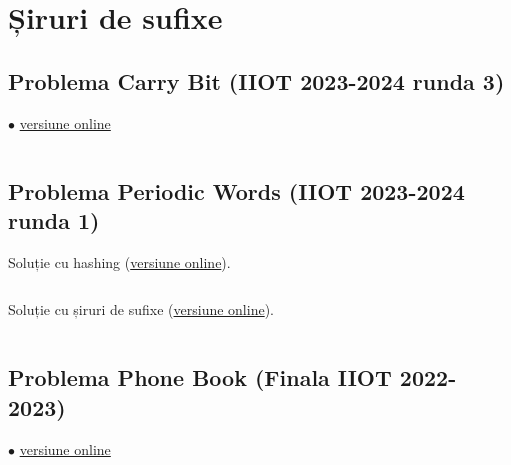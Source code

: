 \documentclass[../main.tex]{subfiles}
\begin{document}
\chapter{Șiruri de sufixe}

\section{Problema Carry Bit (IIOT 2023-2024 runda 3)}
\label{code:carry-bit}
$\bullet$
\href{https://kilonova.ro/submissions/743085}{versiune online}

\inputminted{cpp}{../src/strings/carry-bit.cpp}

\section{Problema Periodic Words (IIOT 2023-2024 runda 1)}
\label{code:periodic-words}

Soluție cu hashing (\href{https://kilonova.ro/submissions/1117503}{versiune online}).

\inputminted{cpp}{../src/strings/periodic-words-hashing.cpp}

Soluție cu șiruri de sufixe (\href{https://kilonova.ro/submissions/1117425}{versiune online}).

\inputminted{cpp}{../src/strings/periodic-words-suffix-array.cpp}

\section{Problema Phone Book (Finala IIOT 2022-2023)}
\label{code:phone-book}
$\bullet$
\href{https://kilonova.ro/submissions/743159}{versiune online}

\inputminted{cpp}{../src/strings/phone-book.cpp}
\end{document}
